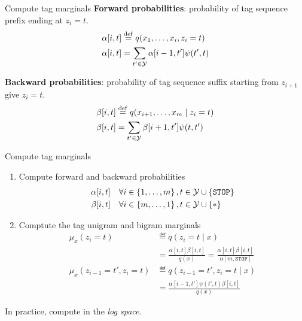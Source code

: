 \documentclass[usenames,dvipsnames,notes,11pt,aspectratio=169]{beamer}
\newcommand{\pdfnote}[1]{}
\begin{document}
\begin{frame}
    {Compute tag marginals}
    \textbf{Forward probabilities}: probability of tag sequence prefix ending at $z_i=t$.
    \begin{align*}
        \alpha[i,t] &\stackrel{\rm def}{=} q(x_1,\ldots,x_i,z_i=t) \\
        \alpha[i,t] &= \sum_{t'\in\mathcal{Y}} \alpha[i-1,t']\psi(t',t)
    \end{align*}

    \textbf{Backward probabilities}: probability of tag sequence suffix starting from $z_{i+1}$ give $z_i=t$.
    \begin{align*}
        \beta[i,t] &\stackrel{\rm def}{=} q(x_{i+1},\ldots,x_m\mid z_i=t) \\
        \beta[i,t] &= \sum_{t'\in\mathcal{Y}} \beta[i+1,t']\psi(t,t')
    \end{align*}
\end{frame}

\begin{frame}
    {Compute tag marginals}
    \begin{enumerate}
        \item Compute forward and backward probabilities
            \begin{align*}
                \alpha[i,t] &\quad \forall i\in\left\{ 1,\ldots,m \right\}, t\in\mathcal{Y}\cup\left\{ \texttt{STOP} \right\}\\
                \beta[i,t] &\quad \forall i\in\left\{ m,\dots,1 \right\}, t\in\mathcal{Y}\cup\left\{ * \right\}
            \end{align*}
        \item Comptute the tag unigram and bigram marginals
    \begin{align*}
        \mu_x(z_i=t) &\eqdef q(z_i=t\mid x) \\
        &= \frac{\alpha[i,t]\beta[i,t]}{q(x)}
        = \frac{\alpha[i,t]\beta[i,t]}{\alpha[m,\texttt{STOP}]} \\
        \mu_x(z_{i-1}=t',z_i=t) &\eqdef q(z_{i-1}=t',z_i=t\mid x) \\
        &= \frac{\alpha[i-1,t']\psi(t',t)\beta[i,t]}{q(x)}
    \end{align*}
    \end{enumerate}
    In practice, compute in the \emph{log space}.
    \pdfnote{
        mu-x are soft counts.
    }
\end{frame}
\end{document}
